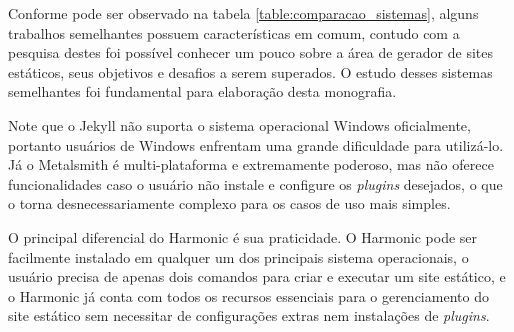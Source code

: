 \documentclass[ppginf, pep]{esinucpel}
\begin{document}
Conforme pode ser observado na tabela \ref{table:comparacao_sistemas}, alguns trabalhos semelhantes possuem características em comum, contudo com a pesquisa destes foi possível conhecer um pouco sobre a área de gerador de sites estáticos, seus objetivos e desafios a serem superados. O estudo desses sistemas semelhantes foi fundamental para elaboração desta monografia.

Note que o Jekyll não suporta o sistema operacional Windows oficialmente, portanto usuários de Windows enfrentam uma grande dificuldade para utilizá-lo. Já o Metalsmith é multi-plataforma e extremamente poderoso, mas não oferece funcionalidades caso o usuário não instale e configure os \textit{plugins} desejados, o que o torna desnecessariamente complexo para os casos de uso mais simples.

O principal diferencial do Harmonic é sua praticidade. O Harmonic pode ser facilmente instalado em qualquer um dos principais sistema operacionais, o usuário precisa de apenas dois comandos para criar e executar um site estático, e o Harmonic já conta com todos os recursos essenciais para o gerenciamento do site estático sem necessitar de configurações extras nem instalações de \textit{plugins}.
\end{document}
